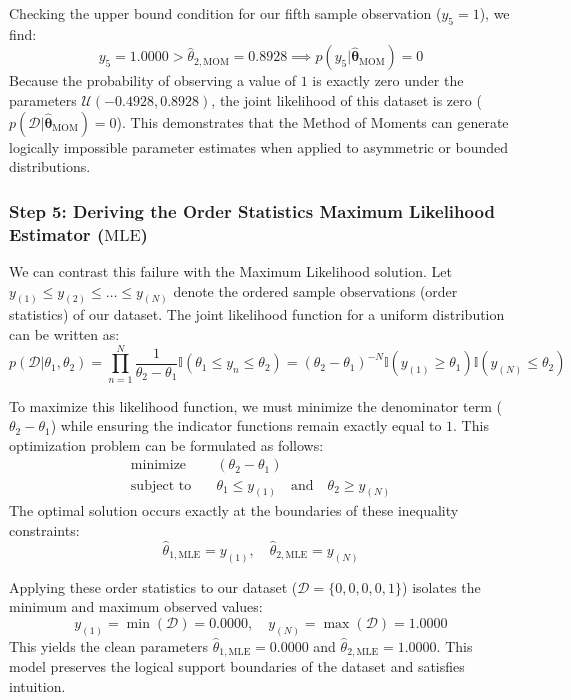 \documentclass{article}
\begin{document}
Checking the upper bound condition for our fifth sample observation ($y_5 = 1$), we find:
\begin{equation}
y_5 = 1.0000 > \hat{\theta}_{2,\text{MOM}} = 0.8928 \implies p(y_5 | \hat{\boldsymbol{\theta}}_{\text{MOM}}) = 0
\end{equation}
Because the probability of observing a value of $1$ is exactly zero under the parameters $\mathcal{U}(-0.4928, 0.8928)$, the joint likelihood of this dataset is zero ($p(\mathcal{D} | \hat{\boldsymbol{\theta}}_{\text{MOM}}) = 0$). This demonstrates that the Method of Moments can generate logically impossible parameter estimates when applied to asymmetric or bounded distributions.

\subsubsection{Step 5: Deriving the Order Statistics Maximum Likelihood Estimator ($\text{MLE}$)}
We can contrast this failure with the Maximum Likelihood solution. Let $y_{(1)} \le y_{(2)} \le \dots \le y_{(N)}$ denote the ordered sample observations (order statistics) of our dataset. The joint likelihood function for a uniform distribution can be written as:
\begin{equation}
p(\mathcal{D} | \theta_1, \theta_2) = \prod_{n=1}^N \frac{1}{\theta_2 - \theta_1} \mathbb{I}(\theta_1 \le y_n \le \theta_2) = (\theta_2 - \theta_1)^{-N} \mathbb{I}(y_{(1)} \ge \theta_1) \mathbb{I}(y_{(N)} \le \theta_2)
\end{equation}

To maximize this likelihood function, we must minimize the denominator term ($\theta_2 - \theta_1$) while ensuring the indicator functions remain exactly equal to $1$. This optimization problem can be formulated as follows:
\begin{align*}
\text{minimize} \quad & (\theta_2 - \theta_1) \\
\text{subject to} \quad & \theta_1 \le y_{(1)} \quad \text{and} \quad \theta_2 \ge y_{(N)}
\end{align*}
The optimal solution occurs exactly at the boundaries of these inequality constraints:
\begin{equation}
\hat{\theta}_{1,\text{MLE}} = y_{(1)}, \quad \hat{\theta}_{2,\text{MLE}} = y_{(N)}
\end{equation}

Applying these order statistics to our dataset ($\mathcal{D} = \{0, 0, 0, 0, 1\}$) isolates the minimum and maximum observed values:
\begin{equation}
y_{(1)} = \min(\mathcal{D}) = \mathbf{0.0000}, \quad y_{(N)} = \max(\mathcal{D}) = \mathbf{1.0000}
\end{equation}
This yields the clean parameters $\hat{\theta}_{1,\text{MLE}} = 0.0000$ and $\hat{\theta}_{2,\text{MLE}} = 1.0000$. This model preserves the logical support boundaries of the dataset and satisfies intuition.
\end{document}
